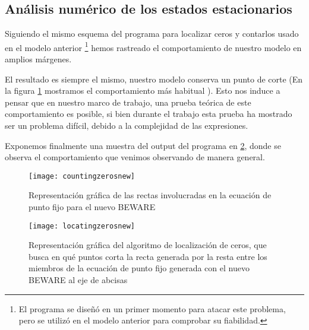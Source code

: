 \subsection{Análisis numérico de los estados estacionarios}

Siguiendo el mismo esquema del programa para localizar ceros y contarlos usado en el modelo anterior \footnote{El programa se diseñó en un primer momento para atacar este problema, pero se utilizó en el modelo anterior para comprobar su fiabilidad.} hemos rastreado el comportamiento de nuestro modelo en amplios márgenes.

 El resultado es siempre el mismo, nuestro modelo conserva un punto de corte (En la figura \ref{locatin} mostramos el comportamiento más habitual ). Esto nos induce a pensar que en nuestro marco de trabajo, una prueba teórica de este comportamiento es posible, si bien durante el trabajo esta prueba ha mostrado ser un problema difícil, debido a la complejidad de las expresiones. 

Exponemos finalmente una muestra del output del programa en \ref{countin}, donde se observa el comportamiento que venimos observando de manera general.

\begin{figure}[h]
	\texttt{[image: countingzerosnew]}
	\centering
	\caption{Representación gráfica de las rectas involucradas en la ecuación de punto fijo para el nuevo BEWARE}
	\label{locatin}
\end{figure}
\begin{figure}[h]
	\texttt{[image: locatingzerosnew]}
	\centering
	\caption{Representación gráfica del algoritmo de localización de ceros, que busca en qué puntos corta la recta generada por la resta entre los miembros de la ecuación de punto fijo generada con el nuevo BEWARE al eje de abcisas}
	\label{countin}
\end{figure}







